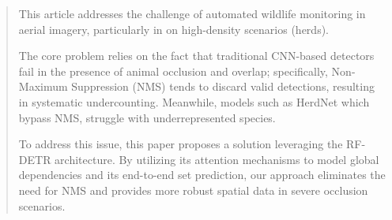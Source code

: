 \begin{abstract}

This article addresses the challenge of automated wildlife monitoring in aerial imagery, particularly in on high-density scenarios (herds).


The core problem relies on the fact that traditional CNN-based detectors fail in the presence of animal occlusion and overlap; specifically, Non-Maximum Suppression (NMS) tends to discard valid detections, resulting in systematic undercounting. Meanwhile, models such as HerdNet which bypass NMS, struggle with underrepresented species.


To address this issue, this paper proposes a solution leveraging the RF-DETR architecture. By utilizing its attention mechanisms to model global dependencies and its end-to-end set prediction, our approach eliminates the need for NMS and provides more robust spatial data in severe occlusion scenarios.


\end{abstract}
